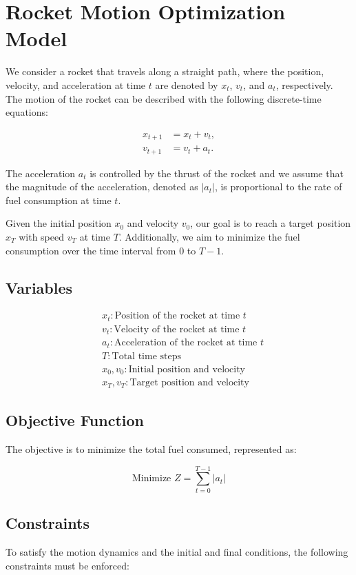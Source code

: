 \documentclass{article}
\begin{document}
\section*{Rocket Motion Optimization Model}

We consider a rocket that travels along a straight path, where the position, velocity, and acceleration at time $t$ are denoted by $x_t$, $v_t$, and $a_t$, respectively. The motion of the rocket can be described with the following discrete-time equations:

\begin{align}
    x_{t+1} &= x_t + v_t, \\
    v_{t+1} &= v_t + a_t.
\end{align}

The acceleration $a_t$ is controlled by the thrust of the rocket and we assume that the magnitude of the acceleration, denoted as $|a_t|$, is proportional to the rate of fuel consumption at time $t$. 

Given the initial position $x_0$ and velocity $v_0$, our goal is to reach a target position $x_T$ with speed $v_T$ at time $T$. Additionally, we aim to minimize the fuel consumption over the time interval from $0$ to $T-1$.

\subsection*{Variables}
\begin{align*}
& x_t: \text{Position of the rocket at time } t \\
& v_t: \text{Velocity of the rocket at time } t \\
& a_t: \text{Acceleration of the rocket at time } t \\
& T: \text{Total time steps} \\
& x_0, v_0: \text{Initial position and velocity} \\
& x_T, v_T: \text{Target position and velocity}
\end{align*}

\subsection*{Objective Function}
The objective is to minimize the total fuel consumed, represented as:

\[
\text{Minimize } Z = \sum_{t=0}^{T-1} |a_t|
\]

\subsection*{Constraints}
To satisfy the motion dynamics and the initial and final conditions, the following constraints must be enforced:
\end{document}
